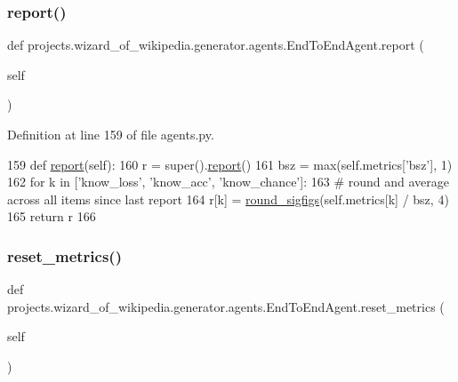 \subsubsection{\texorpdfstring{report()}{report()}}
{\footnotesize\ttfamily def projects.\+wizard\+\_\+of\+\_\+wikipedia.\+generator.\+agents.\+End\+To\+End\+Agent.\+report (\begin{DoxyParamCaption}\item[{}]{self }\end{DoxyParamCaption})}



Definition at line 159 of file agents.\+py.


\begin{DoxyCode}
159     \textcolor{keyword}{def }\hyperlink{namespaceprojects_1_1convai2_1_1eval__f1_a01a47b9c08dad189837a51f085defc45}{report}(self):
160         r = super().\hyperlink{namespaceprojects_1_1convai2_1_1eval__f1_a01a47b9c08dad189837a51f085defc45}{report}()
161         bsz = max(self.metrics[\textcolor{stringliteral}{'bsz'}], 1)
162         \textcolor{keywordflow}{for} k \textcolor{keywordflow}{in} [\textcolor{stringliteral}{'know\_loss'}, \textcolor{stringliteral}{'know\_acc'}, \textcolor{stringliteral}{'know\_chance'}]:
163             \textcolor{comment}{# round and average across all items since last report}
164             r[k] = \hyperlink{namespaceparlai_1_1agents_1_1legacy__agents_1_1seq2seq_1_1utils__v0_af377ec61bfc0423461e7b409ffc883b9}{round\_sigfigs}(self.metrics[k] / bsz, 4)
165         \textcolor{keywordflow}{return} r
166 
\end{DoxyCode}
\mbox{\label{classprojects_1_1wizard__of__wikipedia_1_1generator_1_1agents_1_1EndToEndAgent_a6c75fa85fe522f4e5e0c35b3db5dfebc}} 
\subsubsection{\texorpdfstring{reset\+\_\+metrics()}{reset\_metrics()}}
{\footnotesize\ttfamily def projects.\+wizard\+\_\+of\+\_\+wikipedia.\+generator.\+agents.\+End\+To\+End\+Agent.\+reset\+\_\+metrics (\begin{DoxyParamCaption}\item[{}]{self }\end{DoxyParamCaption})}



